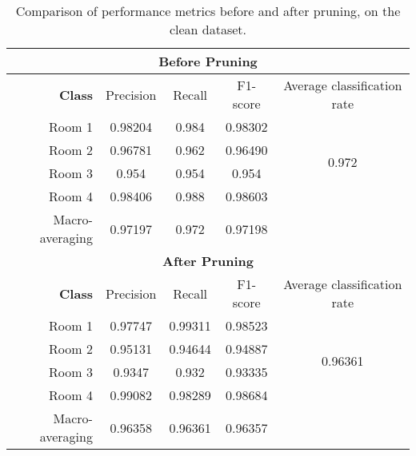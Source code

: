 \documentclass[11pt, a4paper]{article}
\begin{document}
\begin{table}[H]
  \centering
  \setlength{\tabcolsep}{0.25cm}
  \renewcommand{\arraystretch}{1.25}
  \begin{tabular}{|r|c|c|c|c|}
  \hline
  \multicolumn{5}{|c|}{\textbf{Before Pruning}}\\
  \hline
  \textbf{Class} & Precision & Recall & F1-score & Average classification rate \\
  \hline
  Room 1 & 0.98204 & 0.984 & 0.98302 & \multirow{4}{*}{0.972}\\ \cline{1-4}
  Room 2 & 0.96781 & 0.962 & 0.96490 &  \\ \cline{1-4}
  Room 3 & 0.954 & 0.954 & 0.954 &  \\ \cline{1-4}
  Room 4 & 0.98406 & 0.988 & 0.98603 &    \\ \cline{1-4}
  Macro-averaging & 0.97197 & 0.972 & 0.97198 &  \\ \hline
  \multicolumn{5}{|c|}{\textbf{After Pruning}}\\
  \hline
  \textbf{Class} & Precision & Recall & F1-score & Average classification rate \\
  \hline
  Room 1 & 0.97747 & 0.99311 & 0.98523 & \multirow{4}{*}{0.96361}\\ \cline{1-4}
  Room 2 & 0.95131 & 0.94644 & 0.94887 &  \\ \cline{1-4}
  Room 3 & 0.9347 & 0.932 & 0.93335 &  \\ \cline{1-4}
  Room 4 & 0.99082 & 0.98289 & 0.98684 &    \\\cline{1-4}
  Macro-averaging & 0.96358 & 0.96361 & 0.96357 &  \\ \hline
  \end{tabular}
  \caption{Comparison of performance metrics before and after pruning, on the clean dataset.}
  \label{t4}
\end{table}
\end{document}
